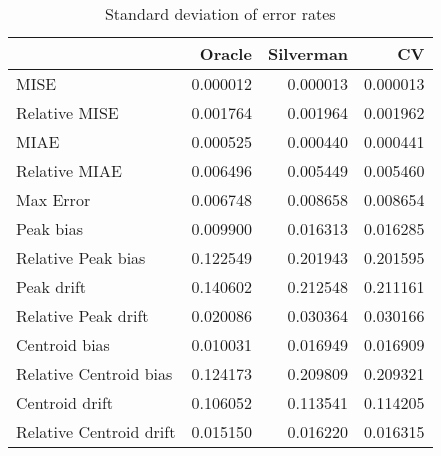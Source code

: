 \begin{table}[ht]
\centering
\begin{tabular}{lrrr}
  \hline
 & Oracle & Silverman & CV \\ 
  \hline
MISE & 0.000012 & 0.000013 & 0.000013 \\ 
  Relative MISE & 0.001764 & 0.001964 & 0.001962 \\ 
  MIAE & 0.000525 & 0.000440 & 0.000441 \\ 
  Relative MIAE & 0.006496 & 0.005449 & 0.005460 \\ 
  Max Error & 0.006748 & 0.008658 & 0.008654 \\ 
  Peak bias & 0.009900 & 0.016313 & 0.016285 \\ 
  Relative Peak bias & 0.122549 & 0.201943 & 0.201595 \\ 
  Peak drift & 0.140602 & 0.212548 & 0.211161 \\ 
  Relative Peak drift & 0.020086 & 0.030364 & 0.030166 \\ 
  Centroid bias & 0.010031 & 0.016949 & 0.016909 \\ 
  Relative Centroid bias & 0.124173 & 0.209809 & 0.209321 \\ 
  Centroid drift & 0.106052 & 0.113541 & 0.114205 \\ 
  Relative Centroid drift & 0.015150 & 0.016220 & 0.016315 \\ 
   \hline
\end{tabular}
\caption{Standard deviation of error rates} 
\label{tbl:stddev_error_rates}
\end{table}
